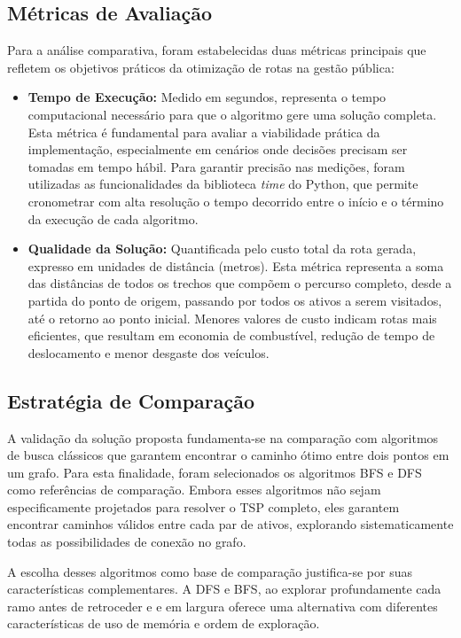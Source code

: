 \subsection{Métricas de Avaliação}

Para a análise comparativa, foram estabelecidas duas métricas principais que refletem os 
objetivos práticos da otimização de rotas na gestão pública:

\begin{itemize}
    \item \textbf{Tempo de Execução:} Medido em segundos, representa o tempo computacional 
    necessário para que o algoritmo gere uma solução completa. Esta métrica é fundamental 
    para avaliar a viabilidade prática da implementação, especialmente em cenários onde 
    decisões precisam ser tomadas em tempo hábil. Para garantir precisão nas medições, foram 
    utilizadas as funcionalidades da biblioteca \textit{time} do Python, que permite 
    cronometrar com alta resolução o tempo decorrido entre o início e o término da execução 
    de cada algoritmo.
    
    \item \textbf{Qualidade da Solução:} Quantificada pelo custo total da rota gerada, 
    expresso em unidades de distância (metros). Esta métrica representa a soma das distâncias 
    de todos os trechos que compõem o percurso completo, desde a partida do ponto de origem, 
    passando por todos os ativos a serem visitados, até o retorno ao ponto inicial. Menores 
    valores de custo indicam rotas mais eficientes, que resultam em economia de combustível, 
    redução de tempo de deslocamento e menor desgaste dos veículos.
\end{itemize}

\subsection{Estratégia de Comparação}

A validação da solução proposta fundamenta-se na comparação com algoritmos de busca clássicos 
que garantem encontrar o caminho ótimo entre dois pontos em um grafo. Para esta finalidade, 
foram selecionados os algoritmos \gls{BFS} e \gls{DFS} como referências de comparação. Embora 
esses algoritmos não sejam especificamente projetados para resolver o \gls{TSP} completo, eles 
garantem encontrar caminhos válidos entre cada par de ativos, explorando sistematicamente todas 
as possibilidades de conexão no grafo.

A escolha desses algoritmos como base de comparação justifica-se por suas características 
complementares. A \gls{DFS} e \gls{BFS}, ao explorar 
profundamente cada ramo antes de retroceder e e em largura oferece uma alternativa com diferentes 
características de uso de memória e ordem de exploração.

